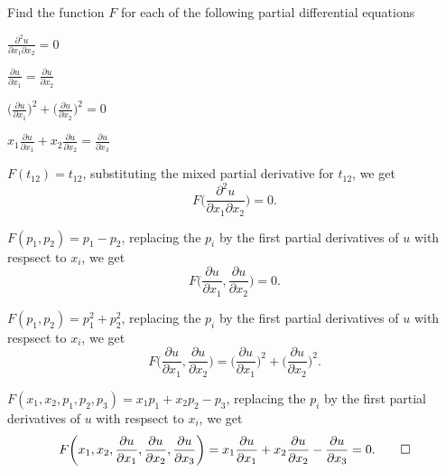 Find the function $F$ for each of the following partial differential
equations
\begin{teilaufgaben}
\item $\displaystyle\frac{\partial^2 u}{\partial x_1\partial x_2}=0$
\item $\displaystyle\frac{\partial u}{\partial x_1}=\frac{\partial u}{\partial x_2}$
\item $\displaystyle
\biggl(\frac{\partial u}{\partial x_1}\biggr)^2+
\biggl(\frac{\partial u}{\partial x_2}\biggr)^2=0$
\item $\displaystyle
x_1\frac{\partial u}{\partial x_1}+
x_2\frac{\partial u}{\partial x_2}=\frac{\partial u}{\partial x_3}$
\end{teilaufgaben}

\begin{loesung}
\begin{teilaufgaben}
\item
$F(t_{12})=t_{12}$,
substituting  the mixed partial derivative for
$t_{12}$, we get
\[
F\biggl(\frac{\partial^2 u}{\partial x_1\partial x_2}\biggr)=0.
\]
\item
$F(p_1,p_2)=p_1-p_2$,
replacing the $p_i$ by the first partial derivatives of $u$ with respsect
to $x_i$, we get
\[
F\biggl(\frac{\partial u}{\partial x_1},\frac{\partial u}{\partial x_2}\biggr)=0.
\]
\item
$F(p_1,p_2)=p_1^2+p_2^2$,
replacing the $p_i$ by the first partial derivatives of $u$ with respsect
to $x_i$, we get
\[
F\biggl(
\frac{\partial u}{\partial x_1},
\frac{\partial u}{\partial x_2}
\biggr)
=
\biggl(\frac{\partial u}{\partial x_1}\biggr)^2+
\biggl(\frac{\partial u}{\partial x_2}\biggr)^2.
\]
\item
$F(x_1,x_2,p_1,p_2,p_3)=x_1p_1+x_2p_2-p_3$,
replacing the $p_i$ by the first partial derivatives of $u$ with respsect
to $x_i$, we get
\[
F\biggl(x_1,x_2,
\frac{\partial u}{\partial x_1},
\frac{\partial u}{\partial x_2},
\frac{\partial u}{\partial x_3}\biggr)=
x_1\frac{\partial u}{\partial x_1}+
x_2\frac{\partial u}{\partial x_2}-\frac{\partial u}{\partial x_3}=0.
\qedhere
\]
\end{teilaufgaben}
\end{loesung}
